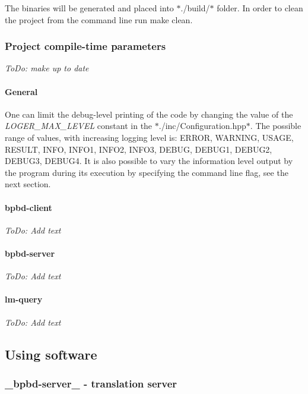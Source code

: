 The binaries will be generated and placed into $\ast$./build/$\ast$ folder. In order to clean the project from the command line run {\ttfamily make clean}.

\subsubsection*{Project compile-\/time parameters}

{\itshape To\+Do\+: make up to date}

\paragraph*{General}

One can limit the debug-\/level printing of the code by changing the value of the {\itshape L\+O\+G\+E\+R\+\_\+\+M\+A\+X\+\_\+\+L\+E\+V\+E\+L} constant in the $\ast$./inc/\+Configuration.hpp$\ast$. The possible range of values, with increasing logging level is\+: E\+R\+R\+O\+R, W\+A\+R\+N\+I\+N\+G, U\+S\+A\+G\+E, R\+E\+S\+U\+L\+T, I\+N\+F\+O, I\+N\+F\+O1, I\+N\+F\+O2, I\+N\+F\+O3, D\+E\+B\+U\+G, D\+E\+B\+U\+G1, D\+E\+B\+U\+G2, D\+E\+B\+U\+G3, D\+E\+B\+U\+G4. It is also possible to vary the information level output by the program during its execution by specifying the command line flag, see the next section.

\paragraph*{bpbd-\/client}

{\itshape To\+Do\+: Add text} \paragraph*{bpbd-\/server}

{\itshape To\+Do\+: Add text} \paragraph*{lm-\/query}

{\itshape To\+Do\+: Add text}

\subsection*{Using software}

\subsubsection*{\+\_\+bpbd-\/server\+\_\+ -\/ translation server}

